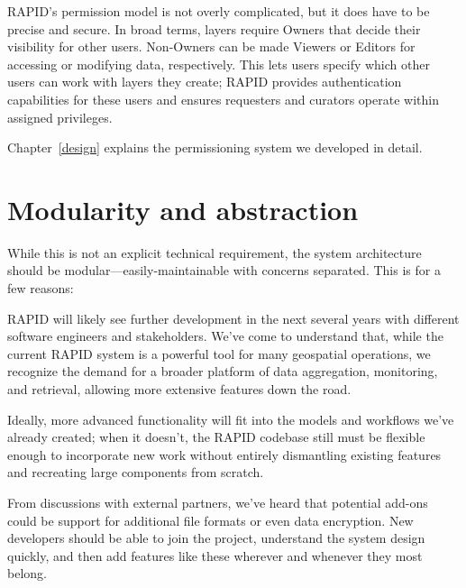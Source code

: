 RAPID's permission model is not overly complicated, but it does have to be precise and secure. In broad terms, layers require Owners that decide their visibility for other users. Non-Owners can be made Viewers or Editors for accessing or modifying data, respectively. This lets users specify which other users can work with layers they create; RAPID provides authentication capabilities for these users and ensures requesters and curators operate within assigned privileges.

Chapter~\ref{design} explains the permissioning system we developed in detail.

\section{Modularity and abstraction}
While this is not an explicit technical requirement, the system architecture should be modular---easily-maintainable with concerns separated. This is for a few reasons:

RAPID will likely see further development in the next several years with different software engineers and stakeholders. We've come to understand that, while the current RAPID system is a powerful tool for many geospatial operations, we recognize the demand for a broader platform of data aggregation, monitoring, and retrieval, allowing more extensive features down the road.

Ideally, more advanced functionality will fit into the models and workflows we've already created; when it doesn't, the RAPID codebase still must be flexible enough to incorporate new work without entirely dismantling existing features and recreating large components from scratch.

From discussions with external partners, we've heard that potential add-ons could be support for additional file formats or even data encryption. New developers should be able to join the project, understand the system design quickly, and then add features like these wherever and whenever they most belong.
